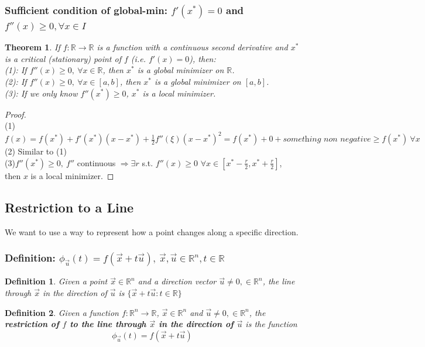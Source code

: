 \documentclass[11pt,a4paper]{article}
\newtheorem{theorem}{Theorem}
\newtheorem{definition}{Definition}
\begin{document}
\subsubsection{ Sufficient condition of global-min: $f'(x^*)=0$ and $f''(x)\geq 0,\forall x\in I$}
\begin{theorem}
    If $f:\mathbb{R} \rightarrow \mathbb{R}$ is a function with a continuous second derivative and $x^*$ is a critical (stationary) point of $f$ (i.e. $f'(x)=0$), then:\\
    (1): If $f''(x)\geq 0,\ \forall x\in\mathbb{R}$, then $x^*$ is a global minimizer on $\mathbb{R}$.\\
    (2): If $f''(x)\geq 0,\ \forall x\in[a,b]$, then $x^*$ is a global minimizer on $[a,b]$.\\
    (3): If we only know $f''(x^*)\geq 0$, $x^*$ is a local minimizer.
\end{theorem}
\begin{proof}
\quad\\
(1)$f(x)=f(x^*)+f'(x^*)(x-x^*)+\frac{1}{2}f''(\xi)(x-x^*)^2=f(x^*)+0+\textit{something non negative}\geq f(x^*)\  \forall x$\\
(2) Similar to (1)\\
(3)$f''(x^*)\geq 0,\ f''$ continuous $\Rightarrow \exists r$ s.t. $f''(x)\geq 0$ $\forall x\in[x^*-\frac{r}{2},x^*+\frac{r}{2}]$, then $x$ is a local minimizer.
\end{proof}

\subsection{ Restriction to a Line}
We want to use a way to represent how a point changes along a specific direction.
\subsubsection{ Definition: $\phi_{\vec{u}}(t)=f(\vec{x}+t\vec{u}),\ \vec{x},\vec{u}\in \mathbb{R}^n, t\in \mathbb{R}$}
\begin{definition}
    Given a point $\vec{x}\in \mathbb{R}^n$ and a direction vector $\vec{u}\neq 0, \in \mathbb{R}^n$, the line through $\vec{x}$ in the direction of $\vec{u}$ is $\{\vec{x}+t \vec{u}: t\in \mathbb{R}\}$
\end{definition}

\begin{definition}
    Given a function $f: \mathbb{R}^n \rightarrow \mathbb{R}$, $\vec{x}\in \mathbb{R}^n$ and $\vec{u}\neq 0, \in \mathbb{R}^n$, the \textbf{restriction of $f$ to the line through $\vec{x}$ in the direction of $\vec{u}$} is the function $$\phi_{\vec{u}}(t)=f(\vec{x}+t\vec{u})$$
\end{definition}
\end{document}
